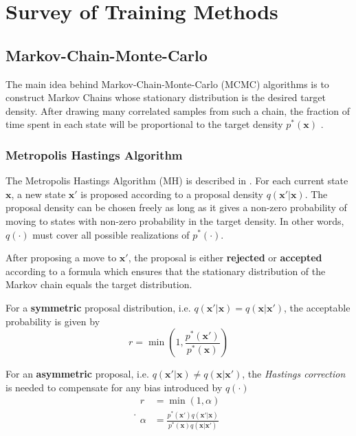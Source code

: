 \chapter{Survey of Training Methods}

\section{Markov-Chain-Monte-Carlo}
The main idea behind Markov-Chain-Monte-Carlo (MCMC) algorithms is to construct Markov Chains whose stationary distribution is the desired target density. After drawing many correlated samples from such a chain, the fraction of time spent in each state will be proportional to the target density $p^*(\mathbf{x})$ \cite{murphy}. 

\subsection{Metropolis Hastings Algorithm}
The Metropolis Hastings Algorithm (MH) is described in \cite[p.~850]{murphy}.
For each current state $\mathbf{x}$, a new state $\mathbf{x'}$ is proposed according to a proposal density $q(\mathbf{x'} | \mathbf{x})$. The proposal density can be chosen freely as long as it gives a non-zero probability of moving to states with non-zero probability in the target density. In other words, $q(\cdot)$ must cover all possible realizations of $p^*(\cdot)$. 

After proposing a move to $\mathbf{x'}$, the proposal is either \textbf{rejected} or \textbf{accepted} according to a formula which ensures that the stationary distribution of the Markov chain equals the target distribution. 

For a \textbf{symmetric} proposal distribution, i.e. $q(\mathbf{x'} | \mathbf{x}) = q(\mathbf{x}| \mathbf{x'})$, the acceptable probability is given by 
\begin{equation}
    r = \min(1, \frac{p^*(\mathbf{x'})}{p^*(\mathbf{x})})
\end{equation}

For an \textbf{asymmetric} proposal, i.e. $q(\mathbf{x'} | \mathbf{x}) \neq q(\mathbf{x} | \mathbf{x'})$, the \textit{Hastings correction} is needed to compensate for any bias introduced by $q(\cdot)$
\begin{subequations}.
\begin{align}
    r &= \min(1, \alpha)\\
    \alpha &= \frac{p^*(\mathbf{x'}) q(\mathbf{x'} | \mathbf{x})}{p^*(\mathbf{x}) q(\mathbf{x}| \mathbf{x'})}\label{eq:mcmc_mh_acceptance}
\end{align}
\end{subequations}

